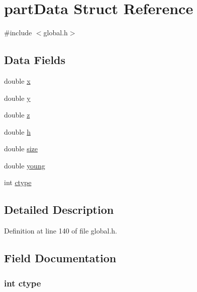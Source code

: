\hypertarget{structpartData}{\section{part\-Data Struct Reference}
\label{structpartData}
}


{\ttfamily \#include $<$global.\-h$>$}

\subsection*{Data Fields}
\begin{DoxyCompactItemize}
\item 
double \hyperlink{structpartData_af88b946fb90d5f08b5fb740c70e98c10}{x}
\item 
double \hyperlink{structpartData_ab927965981178aa1fba979a37168db2a}{y}
\item 
double \hyperlink{structpartData_ab3e6ed577a7c669c19de1f9c1b46c872}{z}
\item 
double \hyperlink{structpartData_a8ee9be1b5aa75abae556de3088cba6d9}{h}
\item 
double \hyperlink{structpartData_aba3c5d750d5dbd6e86c11ecaca62885e}{size}
\item 
double \hyperlink{structpartData_a47ec3689b1fd89ba8e75d9a9975ba63f}{young}
\item 
int \hyperlink{structpartData_a13fbf3c17594503f639a7ef768ea73bb}{ctype}
\end{DoxyCompactItemize}


\subsection{Detailed Description}


Definition at line 140 of file global.\-h.



\subsection{Field Documentation}
\hypertarget{structpartData_a13fbf3c17594503f639a7ef768ea73bb}{
\subsubsection[{ctype}]{\setlength{\rightskip}{0pt plus 5cm}int ctype}}\label{structpartData_a13fbf3c17594503f639a7ef768ea73bb}


